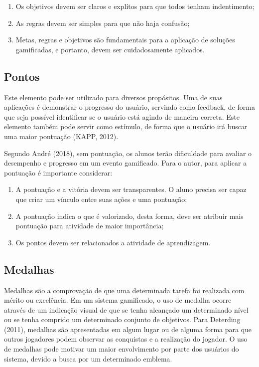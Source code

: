 \documentclass[
	12pt,				%
	oneside,			%
	a4paper,			%
	english,			%
	french,				%
	spanish,			%
	brazil,				%
	]{abntex2}
\begin{document}
\begin{enumerate}
\item Os objetivos devem ser claros e explítos para que todos tenham indentimento;
\item As regras devem ser simples para que não haja confusão;
\item Metas, regras e objetivos são fundamentais para a aplicação de soluções gamificadas, e portanto, devem ser cuidadosamente aplicados.
\end{enumerate}

\subsection{Pontos}

Este elemento pode ser utilizado para diversos propósitos. Uma de suas aplicações é demonstrar o progresso do usuário, servindo como feedback, de forma que seja possível identificar se o usuário está agindo de maneira correta. Este elemento também pode servir como estímulo, de forma que o usuário irá buscar uma maior pontuação (KAPP, 2012). 

Segundo André (2018), sem pontuação, os alunos terão dificuldade para avaliar o desempenho e progresso em um evento gamificado. Para o autor, para aplicar a pontuação é importante considerar:

\begin{enumerate}
\item A pontuação e a vitória devem ser transparentes. O aluno precisa ser capaz que criar um vínculo entre suas ações e uma pontuação;
\item A pontuação indica o que é valorizado, desta forma, deve ser atribuir mais pontuação para atividade de maior importância;
\item Os pontos devem ser relacionados a atividade de aprendizagem.
\end{enumerate}


\subsection{Medalhas}

Medalhas são a comprovação de que uma determinada tarefa foi realizada com mérito ou excelência. Em um sistema gamificado, o uso de medalha ocorre através de um indicação visual de que se tenha alcançado um determinado nível ou se tenha comprido um determinado conjunto de objetivos. Para Deterding (2011), medalhas são apresentadas em algum lugar ou de alguma forma para que outros jogadores podem observar as conquistas e a realização do jogador. O uso de medalhas pode motivar um maior envolvimento por parte dos usuários do sistema, devido a busca por um determinado emblema.
    
\end{document}
